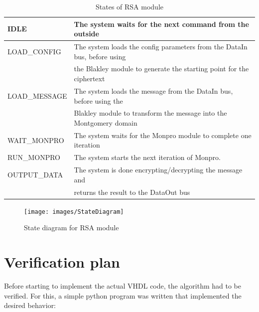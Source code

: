 \begin{table}[H]
    \centering
    \begin{tabular}{|l|l|}
    \hline
        IDLE & The system waits for the next command from the outside \\ \hline
        LOAD\_CONFIG & The system loads the config parameters from the DataIn bus, before using\\ & the Blakley module to generate the starting point for the ciphertext\\ \hline
        LOAD\_MESSAGE & The system loads the message from the DataIn bus, before using the\\ & Blakley module to transform the message into the Montgomery domain \\ \hline
        WAIT\_MONPRO & The system waits for the Monpro module to complete one iteration \\\hline
        RUN\_MONPRO   & The system starts the next iteration of Monpro. \\\hline
        OUTPUT\_DATA & The system is done encrypting/decrypting the message and\\ & returns the result to the DataOut bus \\ \hline
    \end{tabular}
    \caption{States of RSA module}
    \label{tab:states}
\end{table}

\begin{figure}[H]
\centering
\texttt{[image: images/StateDiagram]}
\caption{State diagram for RSA module}
\label{fig:statediagramrsa}
\end{figure}

\section{Verification plan}
Before starting to implement the actual VHDL code, the algorithm had to be verified. For this, a simple python program was written that implemented the desired behavior:

